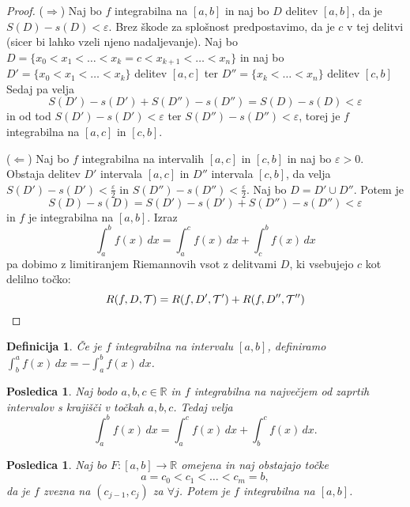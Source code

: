 \documentclass[10pt, a4paper]{article}
\newtheorem{posledica}[izr]{Posledica}
\newtheorem{defi}{Definicija}[section]
\newenvironment{noticeB}{%
  \tcolorbox[%
  notitle,
  empty,
  enhanced,  %
  breakable,
  coltext=black,
  colback=white, 
  fontupper=\rmfamily,
  parbox=false,
  noparskip,
  sharp corners,
  boxrule=-1pt,  %
  frame hidden,
  left=7pt,  %
  right=7pt,
  top=5pt,
  bottom=5pt,
  before skip=2.5ex plus 2pt,
  after skip=2.5ex plus 2pt,
  borderline west = {1.5pt}{-0.1pt}{blue!30!black}, %
  overlay unbroken and last={%
    \draw[color=black, line width=1.25pt]
    ($(frame.south west)+(1.pt, -0.1pt)$) -- ++(2em, 0);
  }
  ]}
{\endtcolorbox}
\newenvironment{definicija}{\begin{defi}\begin{noticeB}}{%
    \end{noticeB}\end{defi}}
\newenvironment{noticeC}{%
  \tcolorbox[%
  notitle,
  empty,
  enhanced,  %
  breakable,
  coltext=black, 
  fontupper=\rmfamily,
  parbox=false,
  noparskip,
  sharp corners,
  boxrule=-1pt,  %
  frame hidden,
  left=7pt,  %
  right=7pt,
  top=5pt,
  bottom=5pt,
  before skip=2.5ex plus 2pt,
  after skip=2.5ex plus 2pt,
  overlay unbroken and last={%
  },
  ]}
{\endtcolorbox}
\newenvironment{dokaz}%
  {\begin{noticeC}\begin{proof}}%
  {\end{proof}\end{noticeC}}
\newcommand{\R}{\mathbb {R}}
\begin{document}
\begin{dokaz}
    ($\Rightarrow$) Naj bo $f$ integrabilna na $[a, b]$ in naj bo $D$ delitev $[a, b]$, da je $S(D) - s(D) < \varepsilon$.
    Brez škode za  splošnost predpostavimo, da je $c$ v tej delitvi (sicer bi lahko vzeli njeno nadaljevanje).
    Naj bo $D = \{x_0 < x_1 < \dots < x_k = c < x_{k+1} < \dots < x_n\}$ in naj bo
    $D' = \{x_0 < x_1 < \dots < x_k\}$ delitev $[a, c]$ ter $D'' = \{x_k < \dots < x_n\}$ delitev $[c, b]$
    Sedaj pa velja $$S(D') - s(D') + S(D'') - s(D'') = S(D) - s(D) < \varepsilon$$ in od tod $S(D') - s(D') < \varepsilon$ ter $S(D'') - s(D'') < \varepsilon$,
    torej je $f$ integrabilna na $[a, c]$ in $[c, b]$.

    ($\Leftarrow$) Naj bo $f$ integrabilna na intervalih $[a, c]$ in $[c, b]$ in
    naj bo $\varepsilon > 0$. Obstaja delitev $D'$ intervala $[a, c]$ in $D''$ intervala $[c, b]$, da velja 
    $S(D') - s(D') < \frac{\varepsilon}{2}$ in $S(D'') - s(D'') < \frac{\varepsilon}{2}$.
    Naj bo $D = D' \cup D''$. Potem je $$S(D) - s(D) = S(D') - s(D') + S(D'') - s(D'') < \varepsilon$$
    in $f$ je integrabilna na $[a, b]$. Izraz $$\int_a ^b f(x)\,dx = \int_a ^c f(x)\,dx + \int_c ^b f(x)\,dx$$ pa dobimo z limitiranjem Riemannovih vsot z delitvami $D$, ki vsebujejo $c$ kot delilno točko:
    \begin{equation*}
        R(f, D, \mathcal{T}) = R(f, D', \mathcal{T}') + R(f, D'', \mathcal{T}'') \qedhere
    \end{equation*}
\end{dokaz}

\begin{definicija}
    Če je $f$ integrabilna na intervalu $[a, b]$, definiramo $\int_b ^a f(x)\,dx = - \int_a ^b f(x)\,dx$.
\end{definicija}

\begin{posledica}
    Naj bodo $a,b,c \in \R$ in $f$ integrabilna na največjem od zaprtih intervalov s krajišči v točkah $a, b, c$.
    Tedaj velja $$\int_a ^b f(x)\,dx = \int_a ^c f(x)\,dx + \int_b ^c f(x)\,dx.$$
\end{posledica}

\begin{posledica}
    Naj bo $F : [a, b] \rightarrow \R$ omejena in naj obstajajo točke $$a = c_0 < c_1 < \dots < c_m = b,$$ da je $f$ zvezna na $(c_{j-1}, c_j)$ za $\forall j$.
    Potem je $f$ integrabilna na $[a, b]$.
\end{posledica}
\end{document}
